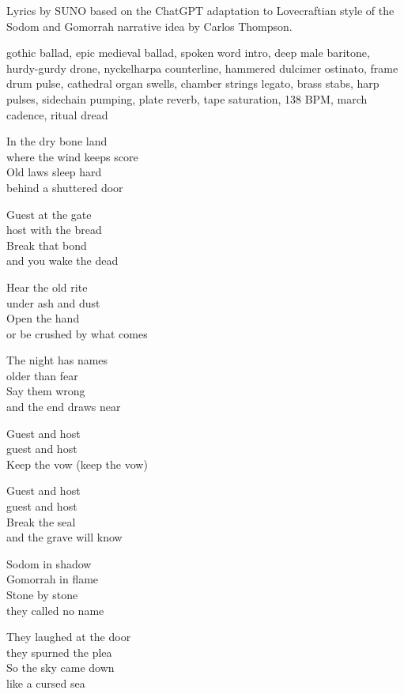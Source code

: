 
\begin{notes}
Lyrics by SUNO based on the ChatGPT adaptation to Lovecraftian style of the Sodom and Gomorrah narrative idea by Carlos Thompson.
\end{notes}
\begin{style}
gothic ballad, epic medieval ballad, spoken word intro, deep male baritone, hurdy-gurdy drone, nyckelharpa counterline, hammered dulcimer ostinato, frame drum pulse, cathedral organ swells, chamber strings legato, brass stabs, harp pulses, sidechain pumping, plate reverb, tape saturation, 138 BPM, march cadence, ritual dread
\end{style}
\begin{lyrics}
In the dry bone land\\
where the wind keeps score\\
Old laws sleep hard\\
behind a shuttered door

Guest at the gate\\
host with the bread\\
Break that bond\\
and you wake the dead

Hear the old rite\\
under ash and dust\\
Open the hand\\
or be crushed by what comes

The night has names\\
older than fear\\
Say them wrong\\
and the end draws near

Guest and host\\
guest and host\\
Keep the vow
(keep the vow)

Guest and host\\
guest and host\\
Break the seal\\
and the grave will know

Sodom in shadow\\
Gomorrah in flame\\
Stone by stone\\
they called no name

They laughed at the door\\
they spurned the plea\\
So the sky came down\\
like a cursed sea


\end{lyrics}
